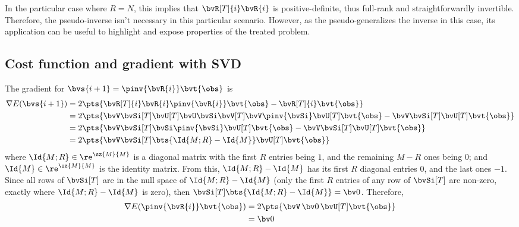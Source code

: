 {%

In the particular case where $R = N$, this implies that $\bvR[T]{i} \bvR{i}$ is positive-definite, thus full-rank and straightforwardly invertible. Therefore, the pseudo-inverse isn't necessary in this particular scenario. However, as the pseudo-generalizes the inverse in this case, its application can be useful to highlight and expose properties of the treated problem.

\subsection{Cost function and gradient with SVD}

The gradient for $\bvs{i+1} = \pinv{\bvR{i}} \bvt{\obs}$ is
\begin{equation}
	\begin{split}
		\nabla E(\bvs{i+1})
		& = 2\pts{\bvR[T]{i} \bvR{i} \pinv{\bvR{i}} \bvt{\obs} - \bvR[T]{i} \bvt{\obs}} \\
		& = 2\pts{\bvV \bvSi[T] \bvU[T] \bvU \bvSi \bvV[T] \bvV \pinv{\bvSi} \bvU[T] \bvt{\obs} - \bvV \bvSi[T] \bvU[T] \bvt{\obs}} \\
		& = 2\pts{\bvV \bvSi[T] \bvSi \pinv{\bvSi} \bvU[T] \bvt{\obs} - \bvV \bvSi[T] \bvU[T] \bvt{\obs}} \\
		& = 2\pts{\bvV \bvSi[T] \bts{\Id{M;R} - \Id{M}} \bvU[T] \bvt{\obs}}
	\end{split}
\end{equation}
where $\Id{M;R} \in \re^{\sz{M}{M}}$ is a diagonal matrix with the first $R$ entries being $1$, and the remaining $M-R$ ones being $0$; and $\Id{M} \in \re^{\sz{M}{M}}$ is the identity matrix. From this, $\Id{M;R} - \Id{M}$ has its first $R$ diagonal entries $0$, and the last ones $-1$. Since all rows of $\bvSi[T]$ are in the null space of $\Id{M;R} - \Id{M}$ (only the first $R$ entries of any row of $\bvSi[T]$ are non-zero, exactly where $\Id{M;R} - \Id{M}$ is zero), then $\bvSi[T]\bts{\Id{M;R} - \Id{M}} = \bv0$. Therefore,
\begin{equation}
	\begin{split}
		\nabla E(\pinv{\bvR{i}} \bvt{\obs})
		& = 2\pts{\bvV \,\bv0\, \bvU[T] \bvt{\obs}} \\
		& = \bv0
	\end{split}
\end{equation}

}
